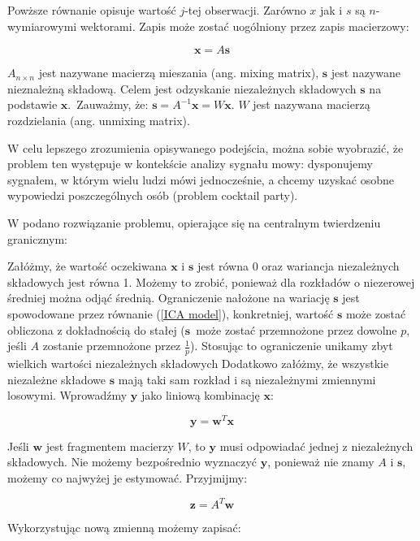 \documentclass[oneside, eng]{mgr}
\newcommand{\bb}{\textbf}
\begin{document}
Powższe równanie opisuje wartość $j$-tej obserwacji. Zarówno $x$ jak i $s$ są $n$-wymiarowymi wektorami. Zapis może zostać uogólniony przez zapis macierzowy:

\begin{equation}
	\bb{x} = A \bb{s}
	\label{ICA model}
\end{equation}

$A_{n \times n}$ jest nazywane macierzą mieszania (ang. mixing matrix), $\bb{s}$ jest nazywane nieznależną składową. Celem jest odzyskanie niezależnych składowych $\bb{s}$ na podstawie $\bb{x}$.~Zauważmy, że: $\bb{s} = A^{-1}\bb{x} = W \bb{x}$. $W$ jest nazywana macierzą rozdzielania (ang. unmixing matrix). 

W celu lepszego zrozumienia opisywanego podejścia, można sobie wyobrazić, że problem ten występuje w kontekście analizy sygnału mowy: dysponujemy sygnałem, w którym wielu ludzi mówi jednocześnie, a chcemy uzyskać osobne wypowiedzi poszczególnych osób (problem cocktail party). 

W \cite{ICA} podano rozwiązanie problemu, opierające się na centralnym twierdzeniu granicznym:

Załóżmy, że wartość oczekiwana $\bb{x}$ i $\bb{s}$ jest równa 0 oraz wariancja niezależnych składowych jest równa 1. Możemy to zrobić, ponieważ dla rozkładów o niezerowej średniej można odjąć średnią. Ograniczenie nałożone na wariację $\bb{s}$ jest spowodowane przez równanie (\ref{ICA model}), konkretniej, wartość $\bb{s}$ może zostać obliczona z dokładnością do stałej ($\bb{s}$~może zostać przemnożone przez dowolne $p$, jeśli $A$ zostanie przemnożone przez $\frac{1}{p}$). Stosując to ograniczenie unikamy zbyt wielkich wartości niezależnych składowych  Dodatkowo załóżmy, że wszystkie niezależne składowe $\bb{s}$ mają taki sam rozkład i są niezależnymi zmiennymi losowymi. Wprowadźmy $\bb{y}$ jako liniową kombinację $\bb{x}$:

\begin{equation}
	\bb{y} = \bb{w}^T \bb{x}
\end{equation}

Jeśli $\bb{w}$ jest fragmentem macierzy $W$, to $\bb{y}$ musi odpowiadać jednej z niezależnych składowych. Nie możemy bezpośrednio wyznaczyć $\bb{y}$, ponieważ nie znamy $A$ i $\bb{s}$, możemy co najwyżej je estymować. Przyjmijmy:

\begin{equation}
	\bb{z} = A^T \bb{w}
\end{equation}

Wykorzystując nową zmienną możemy zapisać:
\end{document}

